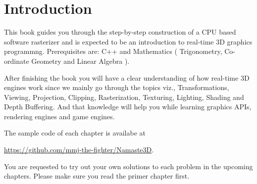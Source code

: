 \chapter{Introduction}
This book guides you through the step-by-step construction of a CPU based software rasterizer and is expected to be an introduction to real-time 3D graphics programmng. Prerequisites are: C++ and Mathematics ( Trigonometry, Co-ordinate Geometry and Linear Algebra ).  

After finishing the book you will have a clear understanding of how real-time 3D engines work since we mainly go through the topics viz., Transformations, Viewing, Projection, Clipping, Rasterization, Texturing, Lighting, Shading and Depth Buffering. And that knowledge will help you while learning graphics APIs, rendering engines and game engines. 

The sample code of each chapter is availabe at 

\url{https://github.com/mmj-the-fighter/Namaste3D}. 

You are requested to try out your own solutions to each problem in the upcoming chapters. 
Please make sure  you read the primer chapter first.





\clearpage